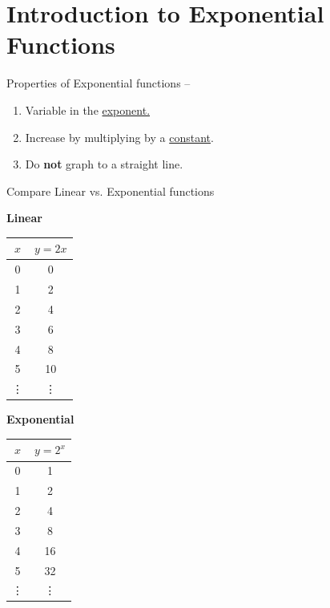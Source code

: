 \documentclass[12pt]{article}
\begin{document}
\pagebreak

\section{Introduction to Exponential Functions} %

Properties of Exponential functions -- 

\begin{enumerate}

\item Variable in the \underline{exponent.}\\

\item Increase by multiplying by a \underline{constant}.\\

\item Do \textbf{not} graph to a straight line.

\end{enumerate}

Compare Linear vs. Exponential functions\\

\begin{multicols}{2}
\begin{center}

\textbf{Linear}\\

{\renewcommand{\arraystretch}{2}
\begin{tabular}{c | c}

	$x$  & $y=2x$ \\ \hline
	0 & 0 \\
	1 & 2 \\
	2 & 4 \\
	3 & 6 \\
	4 & 8 \\
	5 & 10 \\
	\vdots & \vdots

\end{tabular}} \quad

\columnbreak



\textbf{Exponential}\\

{\renewcommand{\arraystretch}{2}
\begin{tabular}{c | c}

	$x$ & $y=2^x$ \\ \hline
	0 & 1 \\
	1 & 2 \\
	2 & 4 \\
	3 & 8 \\
	4 & 16 \\
	5 & 32 \\
	\vdots & \vdots

\end{tabular}} \quad

\end{center}
\end{multicols} 
\end{document}
